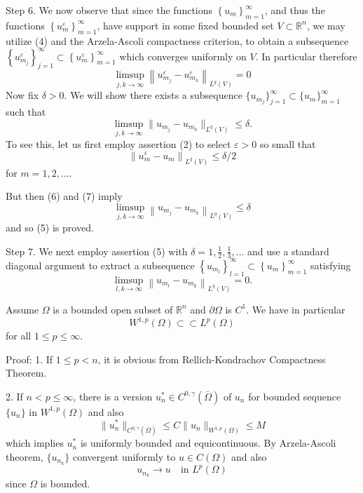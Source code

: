 \begin{theorem}
    Step 6.
    We now observe that since the functions $\left\{u_m\right\}_{m=1}^{\infty}$, and thus the functions $\left\{u_m^{\varepsilon}\right\}_{m=1}^{\infty}$, have support in some fixed bounded set $V \subset \mathbb{R}^n$, we may utilize (4) and the Arzela-Ascoli compactness criterion, to obtain a subsequence $\left\{u_{m_j}^{\varepsilon}\right\}_{j=1}^{\infty} \subset\left\{u_m^{\varepsilon}\right\}_{m=1}^{\infty}$ which converges uniformly on $V$. In particular therefore
    \begin{equation*}
        \limsup _{j, k \rightarrow \infty}\left\|u_{m_j}^{\varepsilon}-u_{m_k}^{\varepsilon}\right\|_{L^q(V)}=0
    \end{equation*}
    Now fix \( \delta > 0 \). We will show there exists a subsequence \(\{u_{m_j}\}_{j=1}^\infty \subset \{u_m\}_{m=1}^\infty\) such that
    \[
        \limsup_{j,k\to\infty} \|u_{m_j} - u_{m_k}\|_{L^q(V)} \leq \delta.
    \]
    To see this, let us first employ assertion (2) to select $\varepsilon>0$ so small that
    \begin{equation*}
        \left\|u_m^{\varepsilon}-u_m\right\|_{L^q(V)} \leq \delta / 2
    \end{equation*}
    for $m=1,2, \ldots$.

    But then (6) and (7) imply
    \begin{equation*}
        \limsup _{j, k \rightarrow \infty}\left\|u_{m_j}-u_{m_k}\right\|_{L^q(V)} \leq \delta
    \end{equation*}
    and so (5) is proved.

    Step 7.
    We next employ assertion (5) with $\delta=1, \frac{1}{2}, \frac{1}{3}, \ldots$ and use a standard diagonal argument to extract a subsequence $\left\{u_{m_l}\right\}_{l=1}^{\infty} \subset\left\{u_m\right\}_{m=1}^{\infty}$ satisfying
    \begin{equation*}
        \limsup _{l, k \rightarrow \infty}\left\|u_{m_l}-u_{m_k}\right\|_{L^q(V)}=0 .
    \end{equation*}
\end{theorem}


\begin{corollary}
    Assume \( \Omega \) is a bounded open subset of \( \mathbb{R}^n \) and \( \partial \Omega \) is \( C^1 \).
    We have in particular
    \[
        W^{1, p}\left(\Omega\right) \subset \subset L^p\left(\Omega\right)
    \]
    for all $1 \leq p \leq \infty$.

    Proof:
    1. If $ 1\leq p <n $, it is obvious from Rellich-Kondrachov Compactness Theorem.

    2. If $ n<p \leq \infty$, there is a version $u_n^*\in C^{0,\gamma}(\bar{\Omega})$ of $u_n$ for bounded sequence $\{u_n\}$ in $W^{1,p}\left(\Omega\right)$
    and also
    \[
        \|u_n^*\|_{C^{0,\gamma}(\bar{\Omega})}\leq C \|u_n\|_{W^{1,p}\left(\Omega\right)}
        \leq
        M
    \]
    which implies $u_n^*$ is uniformly bounded and equicontinuous. By Arzela-Ascoli theorem,
    $\{u_{n_k}\}$ convergent uniformly to $u \in C\left(\Omega\right)$ and also
    \[u_{n_k} \to u \quad \text{in } L^p\left(\Omega\right)\]
    since $\Omega$ is bounded.
\end{corollary}


